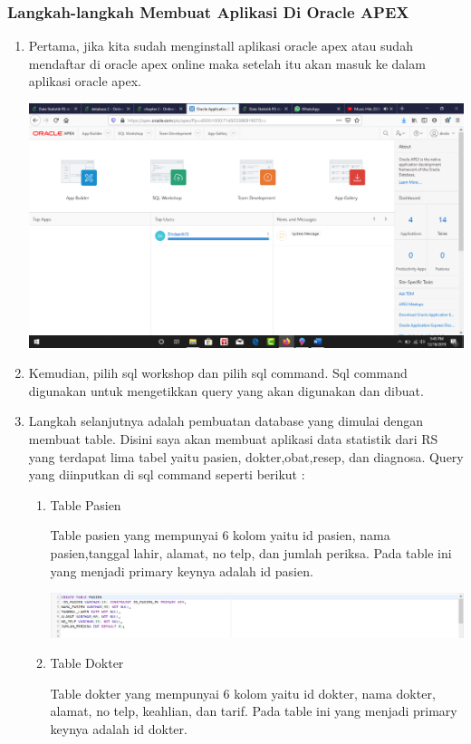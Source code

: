 \subsubsection{Langkah-langkah Membuat Aplikasi Di Oracle APEX}
\begin{enumerate}
    \item Pertama, jika kita sudah menginstall aplikasi oracle apex atau sudah mendaftar di oracle apex online maka setelah itu akan masuk ke dalam aplikasi oracle apex.
     \begin{center}
    \includegraphics[width=10cm\textwidth]{gambar/3.png}
    \end{center}
    \item Kemudian, pilih sql workshop dan pilih sql command. Sql command digunakan untuk mengetikkan query yang akan digunakan dan dibuat.
    \item Langkah selanjutnya adalah pembuatan database yang dimulai dengan membuat table. Disini saya akan membuat aplikasi data statistik dari RS yang terdapat lima tabel yaitu pasien, dokter,obat,resep, dan diagnosa. Query yang diinputkan di sql command seperti berikut :
    \par \begin{enumerate}
        \item Table Pasien
        \par Table pasien yang mempunyai 6 kolom yaitu id pasien, nama pasien,tanggal lahir, alamat, no telp, dan jumlah periksa. Pada table ini yang menjadi primary keynya adalah id pasien.
         \begin{center}
    \includegraphics[width=10cm\textwidth]{gambar/4.png}
    \end{center}
    \item Table Dokter
    \par Table dokter yang mempunyai 6 kolom yaitu id dokter, nama dokter, alamat, no telp, keahlian, dan tarif. Pada table ini yang menjadi primary keynya adalah id dokter.

\end{enumerate}
\end{enumerate}
